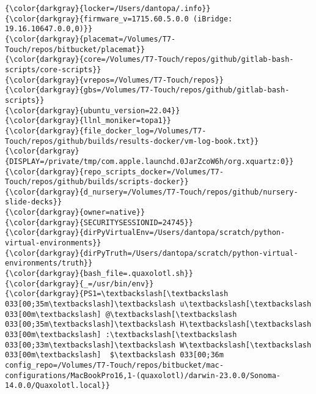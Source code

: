{{\begin{Verbatim}[commandchars=\\\{\}]
{\color{darkgray}{locker=/Users/dantopa/.info}}
{\color{darkgray}{firmware_v=1715.60.5.0.0 (iBridge: 19.16.10647.0.0,0)}}
{\color{darkgray}{placemat=/Volumes/T7-Touch/repos/bitbucket/placemat}}
{\color{darkgray}{core=/Volumes/T7-Touch/repos/github/gitlab-bash-scripts/core-scripts}}
{\color{darkgray}{vrepos=/Volumes/T7-Touch/repos}}
{\color{darkgray}{gbs=/Volumes/T7-Touch/repos/github/gitlab-bash-scripts}}
{\color{darkgray}{ubuntu_version=22.04}}
{\color{darkgray}{llnl_moniker=topa1}}
{\color{darkgray}{file_docker_log=/Volumes/T7-Touch/repos/github/builds/results-docker/vm-log-book.txt}}
{\color{darkgray}{DISPLAY=/private/tmp/com.apple.launchd.0JarZcoW6h/org.xquartz:0}}
{\color{darkgray}{repo_scripts_docker=/Volumes/T7-Touch/repos/github/builds/scripts-docker}}
{\color{darkgray}{d_nursery=/Volumes/T7-Touch/repos/github/nursery-slide-decks}}
{\color{darkgray}{owner=native}}
{\color{darkgray}{SECURITYSESSIONID=24745}}
{\color{darkgray}{dirPyVirtualEnv=/Users/dantopa/scratch/python-virtual-environments}}
{\color{darkgray}{dirPyTruth=/Users/dantopa/scratch/python-virtual-environments/truth}}
{\color{darkgray}{bash_file=.quaxolotl.sh}}
{\color{darkgray}{_=/usr/bin/env}}
{\color{darkgray}{PS1=\textbackslash[\textbackslash 033[00;35m\textbackslash]\textbackslash u\textbackslash[\textbackslash 033[00m\textbackslash] @\textbackslash[\textbackslash 033[00;35m\textbackslash]\textbackslash H\textbackslash[\textbackslash 033[00m\textbackslash] :\textbackslash[\textbackslash 033[00;33m\textbackslash]\textbackslash W\textbackslash[\textbackslash 033[00m\textbackslash]  $\textbackslash 033[00;36m config_repo=/Volumes/T7-Touch/repos/bitbucket/mac-configurations/MacBookPro16,1-(quaxolotl)/darwin-23.0.0/Sonoma-14.0.0/Quaxolotl.local}}
\end{Verbatim}
}}

\endinput  %
